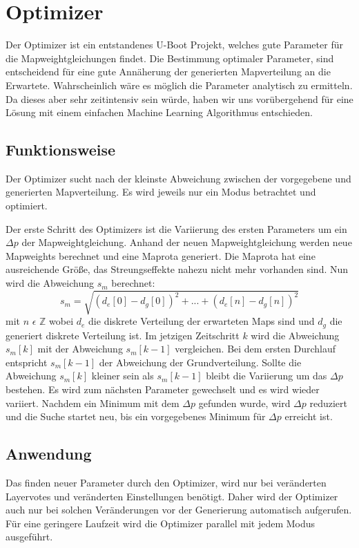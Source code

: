 \section{Optimizer}
Der Optimizer ist ein entstandenes U-Boot Projekt, welches gute Parameter für  die Mapweightgleichungen  findet.
Die Bestimmung optimaler Parameter, sind entscheidend für eine gute Annäherung der generierten Mapverteilung an die Erwartete.
Wahrscheinlich wäre es möglich die Parameter analytisch zu ermitteln. Da dieses aber sehr zeitintensiv sein würde, 
haben wir uns vorübergehend für eine Lösung mit einem einfachen \glqq{}Machine Learning\grqq{} Algorithmus entschieden. 
\subsection{Funktionsweise}
Der Optimizer sucht nach der kleinste Abweichung zwischen der vorgegebene und generierten Mapverteilung. 
Es wird jeweils nur ein Modus betrachtet und optimiert.

Der erste Schritt des Optimizers ist die Variierung des ersten Parameters um ein $\varDelta p$ der Mapweightgleichung.
Anhand der neuen Mapweightgleichung werden neue Mapweights berechnet und eine Maprota generiert.
Die Maprota hat eine ausreichende Größe, das Streungseffekte  nahezu nicht
mehr vorhanden sind. Nun wird die Abweichung $s_m$ berechnet:
\begin{equation}
    s_m = \sqrt{(d_e[0] - d_g[0])^2 + ... + (d_e[n] - d_g[n])^2}
\end{equation}
mit $n$ $\epsilon$ $\mathbb{Z}$
wobei $d_e$ die diskrete Verteilung der erwarteten Maps sind und $d_g$ die generiert diskrete Verteilung ist.
Im jetzigen Zeitschritt $k$  wird die Abweichung $s_m[k]$ mit der Abweichung $s_m[k-1]$ vergleichen. Bei dem ersten Durchlauf entspricht
$s_m[k-1]$ der Abweichung der Grundverteilung. Sollte die Abweichung $s_m[k]$ kleiner sein als $s_m[k-1]$ bleibt die Variierung um das $\varDelta p$ bestehen. 
Es wird zum nächsten Parameter gewechselt und es wird wieder variiert.
Nachdem ein Minimum mit dem $\varDelta p$ gefunden wurde, wird $\varDelta p$ reduziert 
und die Suche startet neu, bis ein vorgegebenes Minimum für $\varDelta p$ erreicht ist.\\
\subsection{Anwendung}
Das finden neuer Parameter durch den Optimizer, wird nur bei veränderten Layervotes und veränderten Einstellungen benötigt.
Daher wird der Optimizer auch nur bei solchen Veränderungen vor der Generierung automatisch aufgerufen. 
Für eine geringere Laufzeit wird die Optimizer parallel mit jedem Modus ausgeführt.